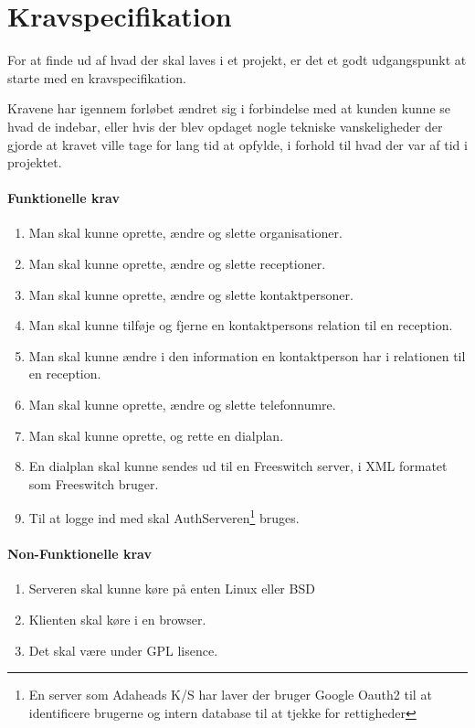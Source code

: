 \section{Kravspecifikation}
For at finde ud af hvad der skal laves i et projekt, er det et godt udgangs\-punkt at starte med en kravspecifikation.

Kravene har igennem forløbet ændret sig i forbindelse med at kunden kunne se hvad de indebar, eller hvis der blev opdaget nogle tekniske vanskeligheder der gjorde at kravet ville tage for lang tid at opfylde, i forhold til hvad der var af tid i projektet.

\paragraph{Funktionelle krav}
\begin{enumerate}
  \item[F 1.] Man skal kunne oprette, ændre og slette organisationer.
  \item[F 2.] Man skal kunne oprette, ændre og slette receptioner.
  \item[F 3.] Man skal kunne oprette, ændre og slette kontaktpersoner.
  \item[F 4.] Man skal kunne tilføje og fjerne en kontaktpersons relation til en reception.
  \item[F 5.] Man skal kunne ændre i den information en kontaktperson har i relationen til en reception.
  \item[F 6.] Man skal kunne oprette, ændre og slette telefonnumre.
  \item[F 7.] Man skal kunne oprette, og rette en dialplan.
  \item[F 8.] En dialplan skal kunne sendes ud til en Freeswitch server, i XML formatet som Freeswitch bruger.
  \item Til at logge ind med skal AuthServeren\footnote{En server som Adaheads K/S har laver der bruger Google Oauth2 til at identificere brugerne og intern database til at tjekke for rettigheder} bruges.
\end{enumerate}

\paragraph{Non-Funktionelle krav}
\begin{enumerate}
  \item[NF 1.] Serveren skal kunne køre på enten Linux eller BSD
  \item[NF 2.] Klienten skal køre i en browser.
  \item[NF 3.] Det skal være under GPL lisence.
\end{enumerate}

